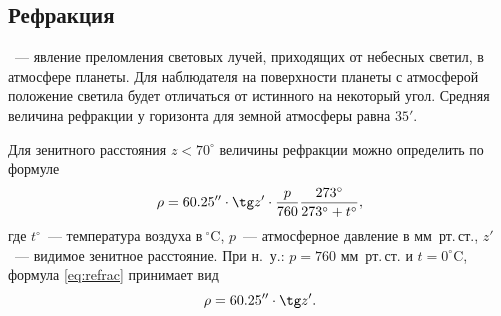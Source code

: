 \subsection{Рефракция}
~--- явление преломления световых лучей, приходящих от небесных светил, в атмосфере планеты. Для наблюдателя на поверхности планеты с атмосферой положение светила будет отличаться от истинного на некоторый угол. Средняя величина рефракции у горизонта для земной атмосферы равна $35'$.

Для зенитного расстояния $z < 70^\circ$ величины рефракции можно определить по формуле
\begin{equation}
	\rho = 60.25'' \cdot \tg z' \cdot \frac{p}{760} \frac{273^{\circ}}{273^{\circ}+ t^{\circ}},
	\label{eq:refrac}
\end{equation}
где $t^{\circ}$~--- температура воздуха в$~^\circ$C, $p$~--- атмосферное давление в мм~рт.\,ст., $z'$~--- видимое зенитное расстояние. При н.~у.: $p = 760$ мм~рт.\,ст. и $t = 0^{\circ}$C, формула \eqref{eq:refrac} принимает вид
\begin{equation}
	\rho = 60.25'' \cdot \tg z'.
\end{equation}
